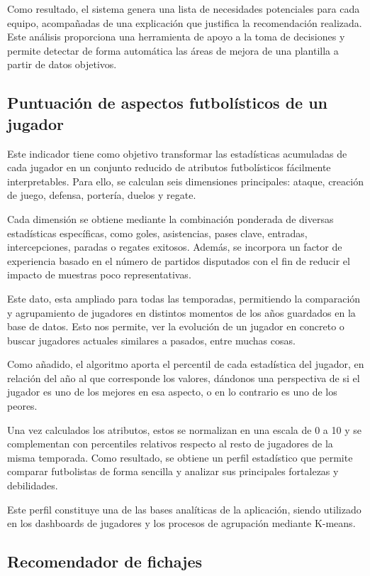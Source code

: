 Como resultado, el sistema genera una lista de necesidades potenciales para cada equipo, acompañadas de una explicación que justifica la recomendación realizada. Este análisis proporciona una herramienta de apoyo a la toma de decisiones y permite detectar de forma automática las áreas de mejora de una plantilla a partir de datos objetivos.

\subsection{Puntuación de aspectos futbolísticos de un jugador}

Este indicador tiene como objetivo transformar las estadísticas acumuladas de cada jugador en un conjunto reducido de atributos futbolísticos fácilmente interpretables. Para ello, se calculan seis dimensiones principales: ataque, creación de juego, defensa, portería, duelos y regate.

Cada dimensión se obtiene mediante la combinación ponderada de diversas estadísticas específicas, como goles, asistencias, pases clave, entradas, intercepciones, paradas o regates exitosos. Además, se incorpora un factor de experiencia basado en el número de partidos disputados con el fin de reducir el impacto de muestras poco representativas.

Este dato, esta ampliado para todas las temporadas, permitiendo la comparación y agrupamiento de jugadores en distintos momentos de los años guardados en la base de datos. Esto nos permite, ver la evolución de un jugador en concreto o buscar jugadores actuales similares a pasados, entre muchas cosas.

Como añadido, el algoritmo aporta el percentil de cada estadística del jugador, en relación del año al que corresponde  los valores, dándonos una perspectiva de si el jugador es uno de los mejores en esa aspecto, o en lo contrario es uno de los peores.

Una vez calculados los atributos, estos se normalizan en una escala de 0 a 10 y se complementan con percentiles relativos respecto al resto de jugadores de la misma temporada. Como resultado, se obtiene un perfil estadístico que permite comparar futbolistas de forma sencilla y analizar sus principales fortalezas y debilidades.

Este perfil constituye una de las bases analíticas de la aplicación, siendo utilizado en los dashboards de jugadores y los procesos de agrupación mediante K-means.

\subsection{Recomendador de fichajes}

